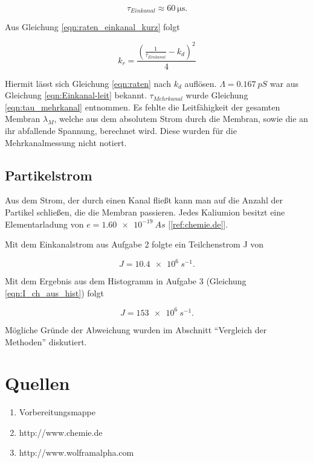 \documentclass[a4paper,ngerman]{scrartcl}
\begin{document}
\begin{equation}
\tau_{Einkanal} \approx \SI{60}{\micro\s}.
\end{equation}

Aus Gleichung \ref{eqn:raten_einkanal_kurz} folgt

\begin{equation}
k_{r} = \frac{ \left( \frac{1}{\tau_{Einkanal}} -k_d \right)^2 }{4}
\end{equation}
 
Hiermit lässt sich Gleichung \ref{eqn:raten} nach $k_d$ auflösen. $\Lambda = \SI{0.167}{pS}$ war aus Gleichung \ref{eqn:Einkanal-leit} bekannt. $\tau_{Mehrkanal}$ wurde Gleichung \ref{eqn:tau_mehrkanal} entnommen. 
Es fehlte die Leitfähigkeit der gesamten Membran $\lambda_M$, welche aus dem absolutem Strom durch die Membran, sowie die an ihr abfallende Spannung, berechnet wird. Diese wurden für die Mehrkanalmessung nicht notiert.


\subsection{Partikelstrom}

Aus dem Strom, der durch einen Kanal fließt kann man auf die Anzahl der Partikel schließen, die die Membran passieren. Jedes Kaliumion besitzt eine Elementarladung von $e = \SI{1.60e-19}{As}$ [\ref{ref:chemie.de}].

Mit dem Einkanalstrom aus Aufgabe 2 folgte ein Teilchenstrom J von

\begin{equation}
J = \SI{10.4e6}{s^{-1}}.
\end{equation}

Mit dem Ergebnis aus dem Histogramm in Aufgabe 3 (Gleichung \ref{eqn:I_ch_aus_hist}) folgt

\begin{equation}
J = \SI{153e6}{s^{-1}}.
\end{equation}

Mögliche Gründe der Abweichung wurden im Abschnitt "`Vergleich der Methoden"' diskutiert.

\clearpage
\section{Quellen}
\begin{enumerate}
\item Vorbereitungsmappe \label{ref:mappe}
\item http://www.chemie.de \label{ref:chemie.de}
\item http://www.wolframalpha.com \label{ref:wolfram}
\end{enumerate}
\end{document}
